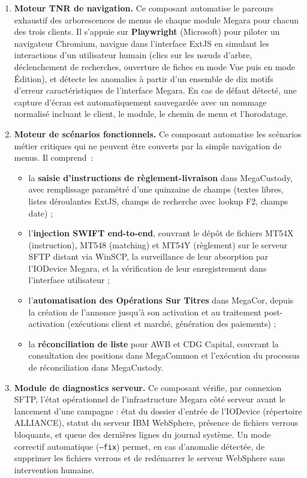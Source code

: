 \documentclass[12pt, a4paper]{report}
\begin{document}
\begin{enumerate}

  \item \textbf{Moteur TNR de navigation.}
  Ce composant automatise le parcours exhaustif des arborescences de menus de chaque module Megara pour chacun des trois clients. Il s'appuie sur \textbf{Playwright} (Microsoft) pour piloter un navigateur Chromium, navigue dans l'interface ExtJS en simulant les interactions d'un utilisateur humain (clics sur les nœuds d'arbre, déclenchement de recherches, ouverture de fiches en mode Vue puis en mode Édition), et détecte les anomalies à partir d'un ensemble de dix motifs d'erreur caractéristiques de l'interface Megara. En cas de défaut détecté, une capture d'écran est automatiquement sauvegardée avec un nommage normalisé incluant le client, le module, le chemin de menu et l'horodatage.

  \item \textbf{Moteur de scénarios fonctionnels.}
  Ce composant automatise les scénarios métier critiques qui ne peuvent être couverts par la simple navigation de menus. Il comprend~:
  \begin{itemize}
    \item la \textbf{saisie d'instructions de règlement-livraison} dans MegaCustody, avec remplissage paramétré d'une quinzaine de champs (textes libres, listes déroulantes ExtJS, champs de recherche avec lookup F2, champs date) ;
    \item l'\textbf{injection SWIFT end-to-end}, couvrant le dépôt de fichiers MT54X (instruction), MT548 (matching) et MT54Y (règlement) sur le serveur SFTP distant via WinSCP, la surveillance de leur absorption par l'IODevice Megara, et la vérification de leur enregistrement dans l'interface utilisateur ;
    \item l'\textbf{automatisation des Opérations Sur Titres} dans MegaCor, depuis la création de l'annonce jusqu'à son activation et au traitement post-activation (exécutions client et marché, génération des paiements) ;
    \item la \textbf{réconciliation de liste} pour AWB et CDG Capital, couvrant la consultation des positions dans MegaCommon et l'exécution du processus de réconciliation dans MegaCustody.
  \end{itemize}

  \item \textbf{Module de diagnostics serveur.}
  Ce composant vérifie, par connexion SFTP, l'état opérationnel de l'infrastructure Megara côté serveur avant le lancement d'une campagne : état du dossier d'entrée de l'IODevice (répertoire ALLIANCE), statut du serveur IBM WebSphere, présence de fichiers verrous bloquants, et queue des dernières lignes du journal système. Un mode correctif automatique (\texttt{--fix}) permet, en cas d'anomalie détectée, de supprimer les fichiers verrous et de redémarrer le serveur WebSphere sans intervention humaine.

\end{enumerate}
\end{document}
